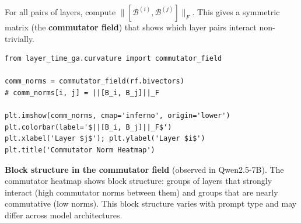 \documentclass[11pt, twoside, openright]{memoir}
\newcommand{\bivec}[1]{\mathcal{B}^{(#1)}}  %
\begin{document}
For all pairs of layers, compute $\|[\bivec{i}, \bivec{j}]\|_F$.  This
gives a symmetric matrix (the \textbf{commutator field}) that shows
which layer pairs interact non-trivially.

\begin{lstlisting}[caption={The commutator heatmap}]
from layer_time_ga.curvature import commutator_field

comm_norms = commutator_field(rf.bivectors)
# comm_norms[i, j] = ||[B_i, B_j]||_F

plt.imshow(comm_norms, cmap='inferno', origin='lower')
plt.colorbar(label='$||[B_i, B_j]||_F$')
plt.xlabel('Layer $j$'); plt.ylabel('Layer $i$')
plt.title('Commutator Norm Heatmap')
\end{lstlisting}

\begin{finding}
\textbf{Block structure in the commutator field} (observed in
Qwen2.5-7B).
The commutator heatmap shows block structure: groups of layers that
strongly interact (high commutator norms between them) and groups that
are nearly commutative (low norms).  This block structure varies with
prompt type and may differ across model architectures.
\end{finding}
\end{document}
